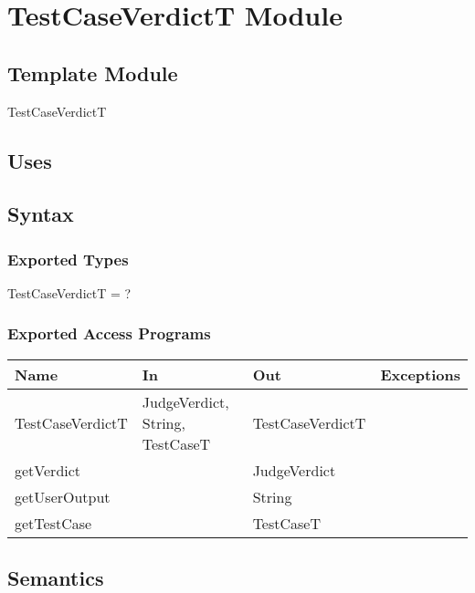 \documentclass[12pt, titlepage]{article}
\begin{document}
\newpage

\section{TestCaseVerdictT Module} \label{TestCaseVerdictT} 

\subsection{Template Module}

TestCaseVerdictT

\subsection{Uses}


\subsection{Syntax}

\subsubsection{Exported Types}

TestCaseVerdictT = ?

\subsubsection{Exported Access Programs}

\begin{center}
\begin{tabular}{ |  p{4cm} | p{3cm} |  p{3cm} | p{5cm} | }
\hline
\textbf{Name} & \textbf{In} & \textbf{Out} & \textbf{Exceptions} \\
\hline
TestCaseVerdictT & JudgeVerdict, String, TestCaseT & TestCaseVerdictT & \\
getVerdict & & JudgeVerdict & \\
getUserOutput & & String & \\
getTestCase & & TestCaseT & \\

\hline
\end{tabular}
\end{center}

\subsection{Semantics}
\end{document}
